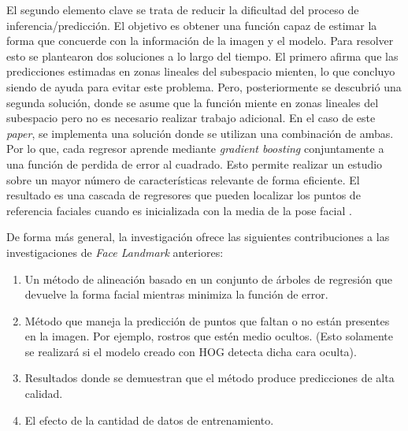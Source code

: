 El segundo elemento clave se trata de reducir la dificultad del proceso de inferencia/predicción. El objetivo es obtener una función capaz de estimar la forma que concuerde con la información de la imagen y el modelo. 
Para resolver esto se plantearon dos soluciones a lo largo del tiempo. El primero afirma que las predicciones estimadas en zonas lineales del subespacio mienten, lo que concluyo siendo de ayuda para evitar este problema. Pero, posteriormente se descubrió una segunda solución, donde se asume que la función miente en zonas lineales del subespacio pero no es necesario realizar trabajo adicional. En el caso de este \textit{paper}, se implementa una solución donde se utilizan una combinación de ambas. Por lo que, cada regresor aprende mediante \textit{gradient boosting} conjuntamente a una función de perdida de error al cuadrado.
Esto permite realizar un estudio sobre un mayor número de características relevante de forma eficiente. El resultado es una cascada de regresores que pueden localizar los puntos de referencia faciales cuando es inicializada con la media de la pose facial \cite{faceLandmark}.

\newpage
De forma más general, la investigación ofrece las siguientes contribuciones a las investigaciones de \textit{Face Landmark} anteriores:

\begin{enumerate}
	\vspace{-0.2cm}
	\item Un método de alineación basado en un conjunto de árboles de regresión que devuelve la forma facial mientras minimiza la función de error.
	\vspace{-0.2cm}
	\item Método que maneja la predicción de puntos que faltan o no están presentes en la imagen. Por ejemplo, rostros que estén medio ocultos. (Esto solamente se realizará si el modelo creado con HOG detecta dicha cara oculta).
	\vspace{-0.2cm}
	\item Resultados donde se demuestran que el método produce predicciones de alta calidad.
	\vspace{-0.2cm}
	\item El efecto de la cantidad de datos de entrenamiento.
\end{enumerate}

